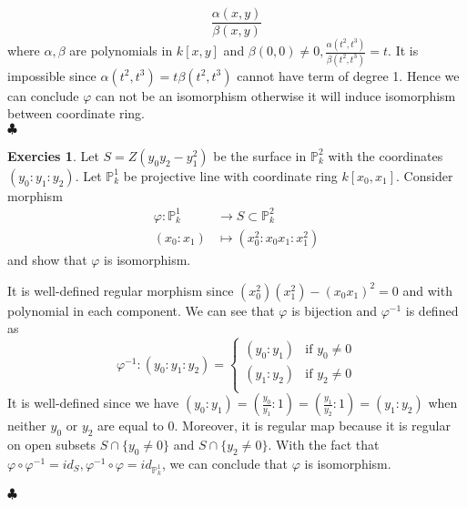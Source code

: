 \documentclass[12pt,a4paper]{article}
\theoremstyle{definition}
\newtheorem{exer}{Exercies}[section]
\newcommand*{\qeds}{\hfill\ensuremath{\clubsuit}}
\begin{document}
\[
\frac{\alpha(x,y)}{\beta(x,y)}
\]
where $\alpha ,\beta$ are polynomials in $k[x,y]$ and $\beta(0,0) \neq 0, \frac{\alpha(t^2,t^3)}{\beta(t^2,t^3)} = t$. It is impossible since $\alpha(t^2,t^3) = t \beta(t^2,t^3)$ cannot have term of degree 1.
Hence we can conclude $\varphi$ can not be an isomorphism otherwise it will induce isomorphism between coordinate ring. \\ \qeds
\begin{exer}
	Let $S= Z(y_0 y_2 - y_1^2)$ be the surface in $\mathbb{P}^2_k$ with the coordinates $(y_0:y_1:y_2)$. Let $\mathbb{P}^1_k$ be projective line with coordinate ring $k[x_0,x_1]$. Consider morphism \[
	\begin{aligned}
	\varphi: \mathbb{P}^1_k &\to S \subset \mathbb{P}^2_k\\
	(x_0:x_1) &\mapsto (x_0^2: x_0x_1: x_1^2)
	\end{aligned}\] and show that $\varphi$ is isomorphism.
\end{exer}
It is well-defined regular morphism since $(x_0^2)(x_1^2) - (x_0 x_1)^2=0$ and with polynomial in each component. We can see that $\varphi$ is bijection and $\varphi^{-1}$ is defined as
\[
\varphi^{-1} \colon (y_0:y_1:y_2) =\begin{cases}
(y_0: y_1)& \text{if } y_0 \neq 0\\
(y_1: y_2)& \text{if } y_2 \neq 0\\
\end{cases} 
\]
It is well-defined since we have $(y_0: y_1) = (\frac{y_0}{y_1}:1) = (\frac{y_1}{y_2}:1) = (y_1:y_2)$ when neither $y_0$ or $y_2$ are  equal to $0$. Moreover, it is regular map because it is regular on open subsets $S \cap \{y_0 \neq 0\}$ and $S \cap \{y_2 \neq 0\}$. With the fact that $\varphi \circ \varphi^{-1} = id_{S}, \varphi^{-1} \circ \varphi = id_{\mathbb{P}^1_k}$, we can conclude that $\varphi$ is isomorphism. 

\qeds
\end{document}
